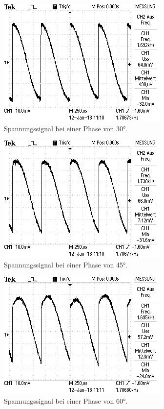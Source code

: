 \begin{figure}[h!tbp]
	\centering
	\includegraphics[angle=-90, width=0.5\linewidth]{rausch3.jpeg}
	\caption{Spannungssignal bei einer Phase von 30°. }
	\label{fig:rausch3}
\end{figure}

\begin{figure}[h!tbp]
	\centering
	\includegraphics[angle=-90, width=0.5\linewidth]{rausch4.jpeg}
	\caption{Spannungssignal bei einer Phase von 45°. }
	\label{fig:rausch4}
\end{figure}

\begin{figure}[h!tbp]
	\centering
	\includegraphics[angle=-90, width=0.5\linewidth]{rausch5.jpeg}
	\caption{Spannungssignal bei einer Phase von 60°. }
	\label{fig:rausch5}
\end{figure}

\pagebreak

